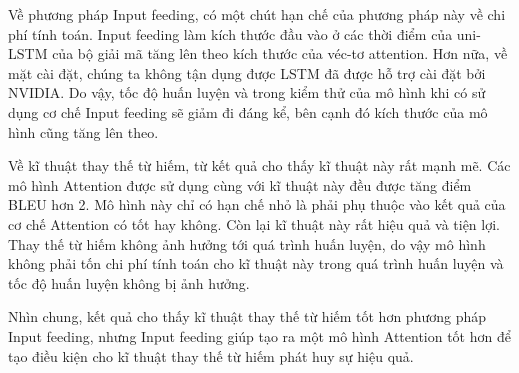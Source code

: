 Về phương pháp Input feeding, có một chút hạn chế của phương pháp này về chi phí tính toán. Input feeding làm kích thước đầu vào ở các thời điểm của uni-LSTM của bộ giải mã tăng lên theo kích thước của véc-tơ attention. Hơn nữa, về mặt cài đặt, chúng ta không tận dụng được LSTM đã được hỗ trợ cài đặt bởi NVIDIA. Do vậy, tốc độ huấn luyện và trong kiểm thử của mô hình khi có sử dụng cơ chế Input feeding sẽ giảm đi đáng kể, bên cạnh đó kích thước của mô hình cũng tăng lên theo.

Về kĩ thuật thay thế từ hiếm, từ kết quả cho thấy kĩ thuật này rất mạnh mẽ. Các mô hình Attention được sử dụng cùng với kĩ thuật này đều được tăng điểm BLEU hơn 2. Mô hình này chỉ có hạn chế nhỏ là phải phụ thuộc vào kết quả của cơ chế Attention có tốt hay không. Còn lại kĩ thuật này rất hiệu quả và tiện lợi. Thay thế từ hiếm không ảnh hưởng tới quá trình huấn luyện, do vậy mô hình không phải tốn chi phí tính toán cho kĩ thuật này trong quá trình huấn luyện và tốc độ huấn luyện không bị ảnh hưởng. 

Nhìn chung, kết quả cho thấy kĩ thuật thay thế từ hiếm tốt hơn phương pháp Input feeding, nhưng Input feeding giúp tạo ra một mô hình Attention tốt hơn để tạo điều kiện cho kĩ thuật thay thế từ hiếm phát huy sự hiệu quả.

